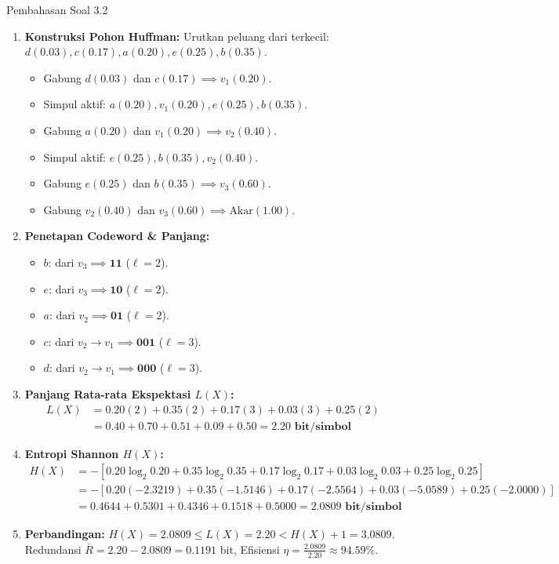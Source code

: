 \documentclass[11pt,a4paper]{article}
\begin{document}
\begin{solusibox}{Pembahasan Soal 3.2}
\begin{enumerate}[leftmargin=*]
    \item \textbf{Konstruksi Pohon Huffman:}
    Urutkan peluang dari terkecil: $d(0.03), c(0.17), a(0.20), e(0.25), b(0.35)$.
    \begin{itemize}
        \item Gabung $d(0.03)$ dan $c(0.17) \implies v_1(0.20)$.
        \item Simpul aktif: $a(0.20), v_1(0.20), e(0.25), b(0.35)$.
        \item Gabung $a(0.20)$ dan $v_1(0.20) \implies v_2(0.40)$.
        \item Simpul aktif: $e(0.25), b(0.35), v_2(0.40)$.
        \item Gabung $e(0.25)$ dan $b(0.35) \implies v_3(0.60)$.
        \item Gabung $v_2(0.40)$ dan $v_3(0.60) \implies \text{Akar}(1.00)$.
    \end{itemize}
    \item \textbf{Penetapan Codeword \& Panjang:}
    \begin{itemize}
        \item $b$: dari $v_3 \implies \mathbf{11}$ ($\ell = 2$).
        \item $e$: dari $v_3 \implies \mathbf{10}$ ($\ell = 2$).
        \item $a$: dari $v_2 \implies \mathbf{01}$ ($\ell = 2$).
        \item $c$: dari $v_2 \to v_1 \implies \mathbf{001}$ ($\ell = 3$).
        \item $d$: dari $v_2 \to v_1 \implies \mathbf{000}$ ($\ell = 3$).
    \end{itemize}
    \item \textbf{Panjang Rata-rata Ekspektasi $L(X)$:}
    \begin{align*}
    L(X) &= 0.20(2) + 0.35(2) + 0.17(3) + 0.03(3) + 0.25(2) \\
    &= 0.40 + 0.70 + 0.51 + 0.09 + 0.50 = \mathbf{2.20 \text{ bit/simbol}}
    \end{align*}
    \item \textbf{Entropi Shannon $H(X)$:}
    \begin{align*}
    H(X) &= -[0.20 \log_2 0.20 + 0.35 \log_2 0.35 + 0.17 \log_2 0.17 + 0.03 \log_2 0.03 + 0.25 \log_2 0.25] \\
    &= -[0.20(-2.3219) + 0.35(-1.5146) + 0.17(-2.5564) + 0.03(-5.0589) + 0.25(-2.0000)] \\
    &= 0.4644 + 0.5301 + 0.4346 + 0.1518 + 0.5000 = \mathbf{2.0809 \text{ bit/simbol}}
    \end{align*}
    \item \textbf{Perbandingan:}
    $H(X) = 2.0809 \le L(X) = 2.20 < H(X) + 1 = 3.0809$.
    Redundansi $\bar{R} = 2.20 - 2.0809 = 0.1191$ bit, Efisiensi $\eta = \frac{2.0809}{2.20} \approx 94.59\%$.
\end{enumerate}
\end{solusibox}
\end{document}
